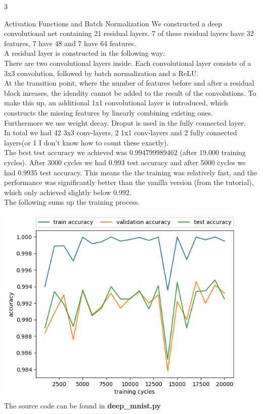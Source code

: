 \documentclass{article}
\begin{document}
\begin{ukon-infie}[24.12.17]{3}
\begin{exercise}[p=40+20]{Activation Functions and Batch Normalization}
		\question{}
		{
			We constructed a deep convolutional net containing 21 residual layers. 7 of these residual layers have 32 features, 7 have 48 and 7 have 64 features. \\
			A residual layer is constructed in the following way:\\
			There are two convolutional layers inside. Each convolutional layer consists of a 3x3 convolution, followed by batch normalization and a ReLU.\\
			At the transition point, where the number of features before and after a residual block inreases, the idendity cannot be added to the result of the convolutions. To make this up, an additional 1x1 convolutional layer is introduced, which constructs the missing features by linearly combining existing ones.\\
			Furthermore we use weight decay. Droput is used in the fully connected layer.\\
			In total we had 42 3x3 conv-layers, 2 1x1 conv-layers and 2 fully connected layers(or 1 I don't know how to count these exactly).\\
			
			The best test accuracy we achieved was 0.994799989462 (after 19.000 training cycles). After 3000 cycles we had 0.993 test accuracy and after 5000 cycles we had 0.9935 test accuracy. This means the the training was relatively fast, and the performance was significantly better than the vanilla version (from the tutorial), which only achieved slightly below 0.992.\\
			The following sums up the training process.\\
			\includegraphics[scale=0.7]{42_layers.png}\\
			The source code can be found in \textbf{deep\_mnist.py}
		}
		\end{exercise}

\end{ukon-infie}
\end{document}

